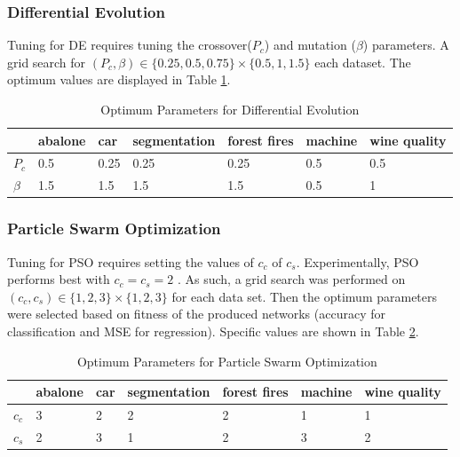 \documentclass[twoside,11pt]{article}
\begin{document}
\subsubsection{Differential Evolution}

	Tuning for DE requires tuning the crossover($P_c$) and mutation ($\beta$) parameters. A grid search for
	$(P_c, \beta) \in \{ 0.25, 0.5, 0.75 \} \times \{ 0.5, 1, 1.5 \}$ 
	each dataset.
	The optimum values are displayed in Table \ref{de-tuning-table}. 
	\begin{table}[h]
		\centering
		\begin{tabular}{|l|l|l|l|l|l|l|}
			\hline
			       & abalone & car & segmentation & forest fires & machine & wine quality  \\ \hline
			$P_c$  &     0.5 & 0.25&         0.25 &         0.25 &     0.5 &          0.5  \\ \hline
			$\beta$&     1.5 & 1.5 &          1.5 &          1.5 &     0.5 &            1  \\ \hline
		\end{tabular}
		\caption{Optimum Parameters for Differential Evolution}
		\label{de-tuning-table}
	\end{table}

\subsubsection{Particle Swarm Optimization}	

	Tuning for PSO requires setting the values of $c_c$ of $c_s$. 
	Experimentally, PSO performs best with $c_c = c_s = 2$ \citep{empirical-pso}. 
	As such, a grid search was performed on $ (c_c, c_s) \in \{ 1, 2, 3 \} \times \{ 1, 2, 3 \} $ for each data set. 
	Then the optimum parameters were selected based on fitness of the produced networks (accuracy for classification and MSE for regression).
	Specific values are shown in Table \ref{pso-tuning-table}.
	\begin{table}[h]
		\centering
		\begin{tabular}{|l|l|l|l|l|l|l|}
			\hline
			       & abalone & car & segmentation & forest fires & machine & wine quality  \\ \hline
			$c_c$  &       3 &   2 &            2 &            2 &       1 &            1  \\ \hline
			$c_s$  &       2 &   3 &            1 &            2 &       3 &            2  \\ \hline
		\end{tabular}
		\caption{Optimum Parameters for Particle Swarm Optimization}
		\label{pso-tuning-table}
	\end{table}
\end{document}

